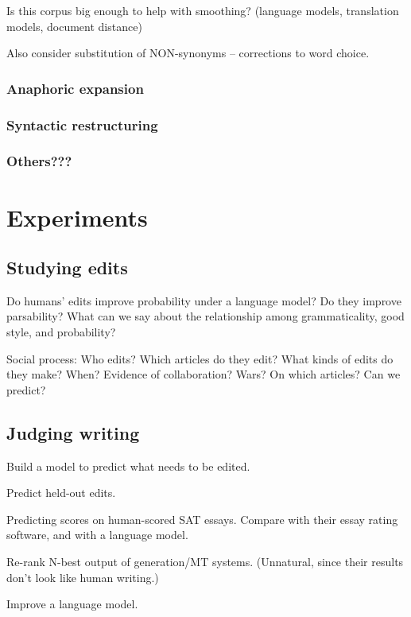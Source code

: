 \documentclass[11pt]{article}
\begin{document}
Is this corpus big enough to help with smoothing?  (language models,
translation models, document distance)

Also consider substitution of NON-synonyms -- corrections to word
choice.

\subsubsection{Anaphoric expansion}

\subsubsection{Syntactic restructuring}

\subsubsection{Others???}

\section{Experiments}

\subsection{Studying edits}

Do humans' edits improve probability under a language model?  Do they
improve parsability?  What can we say about the relationship among
grammaticality, good style, and probability?

Social process: Who edits?  Which articles do they edit?  What kinds
of edits do they make?  When?  Evidence of collaboration?  Wars?  On
which articles?  Can we predict?

\subsection{Judging writing}

Build a model to predict what needs to be edited.

Predict held-out edits.

Predicting scores on human-scored SAT essays.  Compare with their
essay rating software, and with a language model.

Re-rank N-best output of generation/MT systems.  (Unnatural, 
since their results don't look like human writing.)

Improve a language model.
\end{document}
